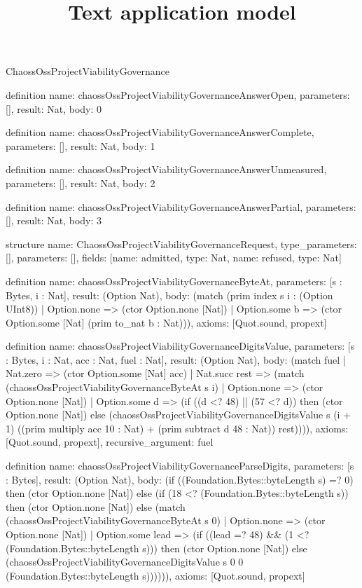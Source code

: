 \begin{lexlean}{ChaossOssProjectViabilityGovernance}
\title{Text application model}
\begin{semanticmodule}
definition{
  name: chaossOssProjectViabilityGovernanceAnswerOpen,
  parameters: [],
  result: Nat,
  body: 0
}

definition{
  name: chaossOssProjectViabilityGovernanceAnswerComplete,
  parameters: [],
  result: Nat,
  body: 1
}

definition{
  name: chaossOssProjectViabilityGovernanceAnswerUnmeasured,
  parameters: [],
  result: Nat,
  body: 2
}

definition{
  name: chaossOssProjectViabilityGovernanceAnswerPartial,
  parameters: [],
  result: Nat,
  body: 3
}

structure{
  name: ChaossOssProjectViabilityGovernanceRequest,
  type_parameters: [],
  parameters: [],
  fields: [{name: admitted, type: Nat}, {name: refused, type: Nat}]
}

definition{
  name: chaossOssProjectViabilityGovernanceByteAt,
  parameters: [s : Bytes, i : Nat],
  result: (Option Nat),
  body: (match (prim index s i : (Option UInt8))
    | Option.none => (ctor Option.none [Nat])
    | Option.some b => (ctor Option.some [Nat] (prim to_nat b : Nat))),
  axioms: [Quot.sound, propext]
}

definition{
  name: chaossOssProjectViabilityGovernanceDigitsValue,
  parameters: [s : Bytes, i : Nat, acc : Nat, fuel : Nat],
  result: (Option Nat),
  body: (match fuel
    | Nat.zero => (ctor Option.some [Nat] acc)
    | Nat.succ rest => (match (chaossOssProjectViabilityGovernanceByteAt s i)
      | Option.none => (ctor Option.none [Nat])
      | Option.some d => (if ((d <? 48) || (57 <? d)) then (ctor Option.none [Nat]) else (chaossOssProjectViabilityGovernanceDigitsValue s (i + 1) ((prim multiply acc 10 : Nat) + (prim subtract d 48 : Nat)) rest)))),
  axioms: [Quot.sound, propext],
  recursive_argument: fuel
}

definition{
  name: chaossOssProjectViabilityGovernanceParseDigits,
  parameters: [s : Bytes],
  result: (Option Nat),
  body: (if ((Foundation.Bytes::byteLength s) =? 0) then (ctor Option.none [Nat]) else (if (18 <? (Foundation.Bytes::byteLength s)) then (ctor Option.none [Nat]) else (match (chaossOssProjectViabilityGovernanceByteAt s 0)
    | Option.none => (ctor Option.none [Nat])
    | Option.some lead => (if ((lead =? 48) && (1 <? (Foundation.Bytes::byteLength s))) then (ctor Option.none [Nat]) else (chaossOssProjectViabilityGovernanceDigitsValue s 0 0 (Foundation.Bytes::byteLength s)))))),
  axioms: [Quot.sound, propext]
}


\end{semanticmodule}
\end{lexlean}
